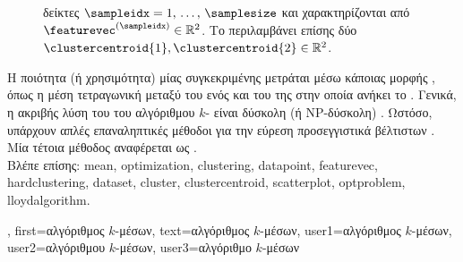 {{\begin{figure}[H]
{{{			δεί\-κτες $\sampleidx=1,\,\ldots,\,\samplesize$ και χαρακτηρίζονται από}  
			$\featurevec^{(\sampleidx)} \in \mathbb{R}^{2}$. \foreignlanguage{greek}{Το}  
			\foreignlanguage{greek}{περιλαμβάνει επίσης δύο} 
			$\clustercentroid{1}, \clustercentroid{2} \in \mathbb{R}^{2}$. \label{fig_kmeans_dict}} }
		\end{figure} 
		\foreignlanguage{greek}{Η ποιότητα (ή χρησιμότητα) μίας συγκεκριμένης}  \foreignlanguage{greek}{μετράται 
		μέσω κάποιας μορφής} , \foreignlanguage{greek}{όπως η μέση τετραγωνική}  
		\foreignlanguage{greek}{μεταξύ του}  \foreignlanguage{greek}{ενός}  
		\foreignlanguage{greek}{και του}  \foreignlanguage{greek}{της}  
		\foreignlanguage{greek}{στην οποία ανήκει το} . 
		\foreignlanguage{greek}{Γενικά, η ακριβής λύση του}  \foreignlanguage{greek}{του αλγόριθμου} 
		$k$- \foreignlanguage{greek}{είναι δύσκολη (ή} NP-\foreignlanguage{greek}{δύσκολη)} \cite{Mahajan2009Springer}. 
		\foreignlanguage{greek}{Ωστόσο, υπάρχουν απλές επαναληπτικές μέθοδοι για την εύρεση προσεγγιστικά βέλτιστων} 
		. \foreignlanguage{greek}{Μία τέτοια μέθοδος αναφέρεται ως} .
		\\
		\foreignlanguage{greek}{Βλέπε επίσης:} \gls{mean}, \gls{optimization}, \gls{clustering}, \gls{datapoint}, \gls{featurevec}, \gls{hardclustering}, 
		\gls{dataset}, \gls{cluster}, \gls{clustercentroid}, \gls{scatterplot}, \gls{optproblem}, \gls{lloydalgorithm}.},
	first={\foreignlanguage{greek}{αλγόριθμος $k$-μέσων}},
	text={\foreignlanguage{greek}{αλγόριθμος $k$-μέσων}},
	user1={\foreignlanguage{greek}{αλγόριθμος $k$-μέσων}}, %
	user2={\foreignlanguage{greek}{αλγόριθμου $k$-μέσων}}, %
	user3={\foreignlanguage{greek}{αλγόριθμο $k$-μέσων}} %
}

